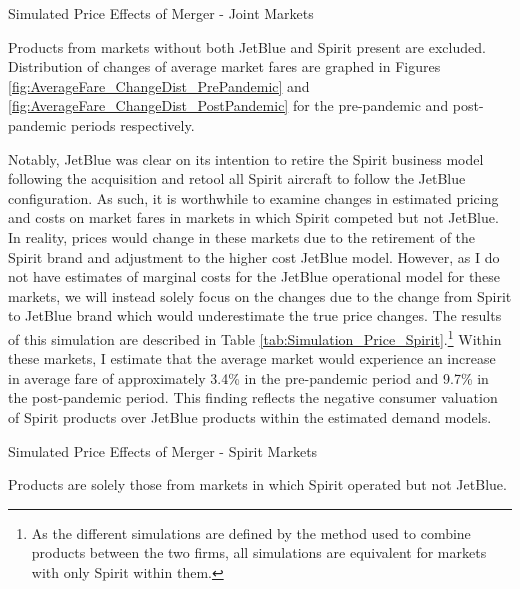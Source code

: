 \documentclass{article}
\begin{document}
    \begin{table}
        \caption{Simulated Price Effects of Merger - Joint Markets}
        \label{tab:Simulation_Price}
                \vspace{-15mm}
        \begin{center}
         
        \end{center}
        \vspace{-5mm}
        \footnotesize{Products from markets without both JetBlue and Spirit present are excluded. Distribution of changes of average market fares are graphed in Figures \ref{fig:AverageFare_ChangeDist_PrePandemic} and \ref{fig:AverageFare_ChangeDist_PostPandemic} for the pre-pandemic and post-pandemic periods respectively.}

     \end{table}

    Notably, JetBlue was clear on its intention to retire the Spirit business model following the acquisition and retool all Spirit aircraft to follow the JetBlue configuration. As such, it is worthwhile to examine changes in estimated pricing and costs on market fares in markets in which Spirit competed but not JetBlue. In reality, prices would change in these markets due to the retirement of the Spirit brand and adjustment to the higher cost JetBlue model. However, as I do not have estimates of marginal costs for the JetBlue operational model for these markets, we will instead solely focus on the changes due to the change from Spirit to JetBlue brand which would underestimate the true price changes. The results of this simulation are described in Table \ref{tab:Simulation_Price_Spirit}.\footnote{As the different simulations are defined by the method used to combine products between the two firms, all simulations are equivalent for markets with only Spirit within them.} Within these markets, I estimate that the average market would experience an increase in average fare of approximately 3.4\% in the pre-pandemic period and 9.7\% in the post-pandemic period. This finding reflects the negative consumer valuation of Spirit products over JetBlue products within the estimated demand models.

    \begin{table}
        \caption{Simulated Price Effects of Merger - Spirit Markets}
        \label{tab:Simulation_Price_Spirit}
                        \vspace{-15mm}
        \begin{center}
              
        \end{center}
        \vspace{-5mm}
        \footnotesize{Products are solely those from markets in which Spirit operated but not JetBlue.}
    \end{table}
\end{document}
